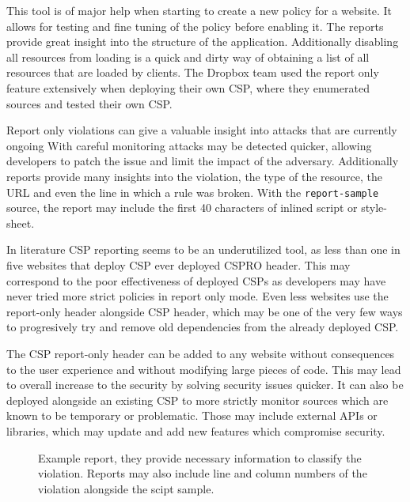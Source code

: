 This tool is of major help when starting to create a new policy for a website.
It allows for testing and fine tuning of the policy before enabling it. 
The reports provide great insight into the structure of the application.
Additionally disabling all resources from loading is a quick and dirty way of obtaining a list of all resources that are loaded by clients.
The Dropbox team used the report only feature extensively when deploying their own CSP, where they enumerated sources and tested their own CSP. \cite{dropboxcsp}


Report only violations can give a valuable insight into attacks that are currently ongoing 
With careful monitoring attacks may be detected quicker, allowing developers to patch the issue and limit the impact of the adversary.
Additionally reports provide many insights into the violation, the type of the resource, the URL and even the line in which a rule was broken.
With the \texttt{report-sample} source, the report may include the first 40 characters of inlined script or style-sheet.

In literature CSP reporting seems to be an underutilized tool, as less than one in five websites that deploy CSP ever deployed CSPRO header. \cite{osti_10173479}
This may correspond to the poor effectiveness of deployed CSPs as developers may have never tried more strict policies in report only mode.
Even less websites use the report-only header alongside CSP header, which may be one of the very few ways to progresively try and remove old dependencies from the already deployed CSP.

The CSP report-only header can be added to any website without consequences to the user experience and without modifying large pieces of code.
This may lead to overall increase to the security by solving security issues quicker.
It can also be deployed alongside an existing CSP to more strictly monitor sources which are known to be temporary or problematic.
Those may include external APIs or libraries, which may update and add new features which compromise security.

\begin{figure}[H]
	
	\caption{Example report, they provide necessary information to classify the violation. Reports may also include line and column numbers of the violation alongside the scipt sample.  }
	\label{exReport}
\end{figure}



